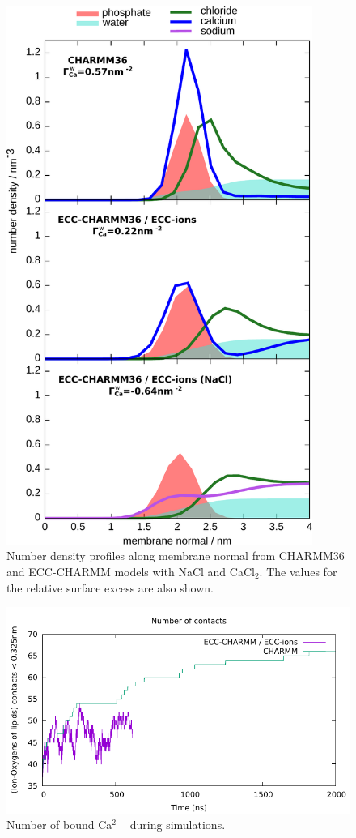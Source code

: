 \documentclass[journal=jpcbfk]{achemso}
\begin{document}
\newpage
\begin{figure}[!h]
  \centering
  \includegraphics[width=10.0cm]{../Fig/density2.pdf}
  \caption{\label{scaledCHARMMdensity}
    Number density profiles along membrane normal from CHARMM36 \cite{klauda10} and ECC-CHARMM models with NaCl and CaCl$_2$.
    The values for the relative surface excess are also shown.
  }
\end{figure}

\newpage
\begin{figure}[!h]
  \centering
  \includegraphics[width=16.0cm]{../Fig/contacts_ca.pdf}
  \caption{\label{scaledCHARMMcontacts}
    Number of bound Ca$^{2+}$ during simulations.
  }
\end{figure}
\end{document}
